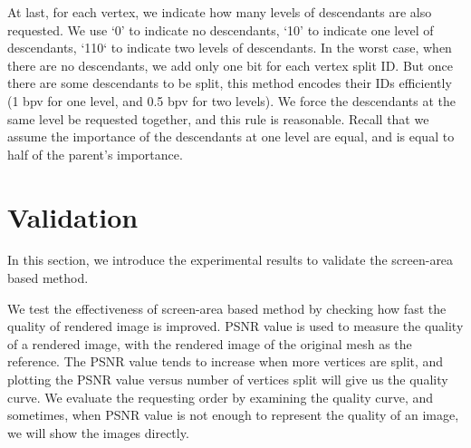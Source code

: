 
    At last, for each vertex, we indicate how many levels of descendants are also requested.
    We use `0' to indicate no descendants, `10' to indicate one level of descendants,
    `110` to indicate two levels of descendants. 
    In the worst case, when there are no descendants, we add only one bit for each vertex split
    ID. But once there are some descendants to be split, this method encodes their IDs 
    efficiently (1 bpv for one level, and 0.5 bpv for two levels). 
    We force the descendants at the same level be requested together, and 
    this rule is reasonable. Recall that we assume the importance of the descendants at one level are equal, 
    and is equal to half of the parent's importance.
\section{Validation}
\label{s:dstream:evaluation}
In this section, we introduce the experimental results to 
validate the screen-area based method.

We test the effectiveness of screen-area based method by checking
how fast the quality of rendered image is improved. PSNR value 
is used to measure the quality of a rendered
image, with the rendered image of the original mesh as the reference. 
The PSNR value tends to increase when more vertices are split, 
and plotting the PSNR value versus number of vertices split
will give us the quality curve. 
We evaluate the requesting order by examining the quality
curve, and sometimes, when PSNR value is not enough to 
represent the quality of an image, we will show the images directly.

